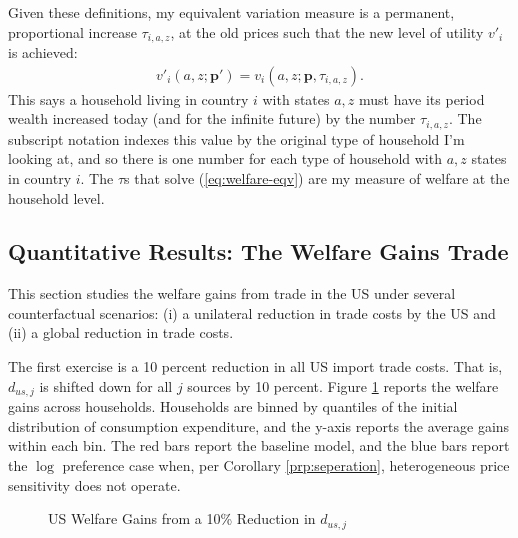 \documentclass[12pt,pdftex]{article}
\begin{document}
\begin{onehalfspacing}
Given these definitions, my equivalent variation measure is a permanent, proportional increase $\tau_{i,a,z}$, at the old prices such that the new level of utility $v'_i$ is achieved:
\begin{align}
v'_i(a,z ; \mathbf{p'}) = v_i(a,z ; \mathbf{p}, \tau_{i, a,z}). \label{eq:welfare-eqv}
\end{align}
This says a household living in country $i$ with states $a,z$ must have its period wealth increased today (and for the infinite future) by the number $\tau_{i,a,z}$. The subscript notation indexes this value by the original type of household I'm looking at, and so there is one number for each type of household with $a,z$ states in country $i$. The $\tau$s that solve (\ref{eq:welfare-eqv}) are my measure of welfare at the household level.

\subsection{Quantitative Results: The Welfare Gains Trade}

This section studies the welfare gains from trade in the US under several counterfactual scenarios: (i) a unilateral reduction in trade costs by the US and (ii) a global reduction in trade costs.

The first exercise is a 10 percent reduction in all US import trade costs. That is, $d_{us,j}$ is shifted down for all $j$ sources by 10 percent. Figure \ref{fig:welfare-households} reports the welfare gains across households. Households are binned by quantiles of the initial distribution of consumption expenditure, and the y-axis reports the average gains within each bin. The red bars report the baseline model, and the blue bars report the $\log$ preference case when, per Corollary \ref{prp:seperation}, heterogeneous price sensitivity does not operate.

\begin{figure}[!t]
\caption{US Welfare Gains from a 10\% Reduction in $d_{us,j}$ }\label{fig:welfare-households}
\end{figure}


\end{onehalfspacing}
\end{document}
